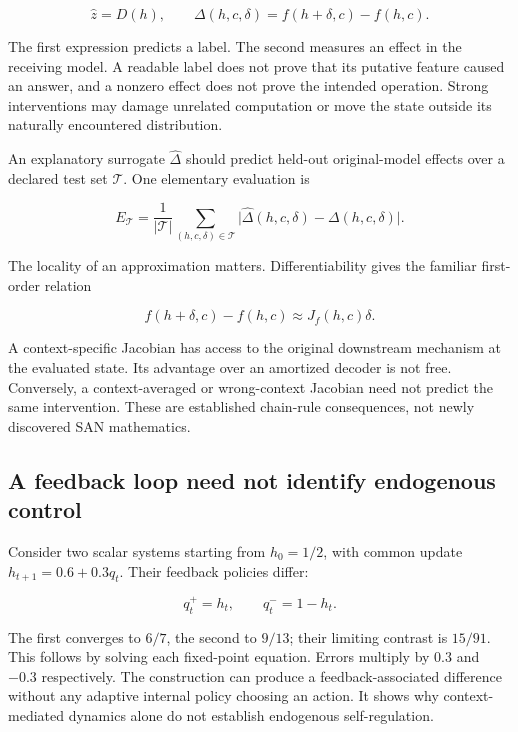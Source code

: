 \documentclass[11pt,letterpaper]{article}
\begin{document}
\begin{equation}
\widehat z=D(h),\qquad
\Delta(h,c,\delta)=f(h+\delta,c)-f(h,c). \tag{1}
\end{equation}

The first expression predicts a label. The second measures an effect in the receiving model. A readable label does not prove that its putative feature caused an answer, and a nonzero effect does not prove the intended operation. Strong interventions may damage unrelated computation or move the state outside its naturally encountered distribution.

An explanatory surrogate \(\widehat\Delta\) should predict held-out original-model effects over a declared test set \(\mathcal T\). One elementary evaluation is

\begin{equation}
E_{\mathcal T}=\frac{1}{|\mathcal T|}
\sum_{(h,c,\delta)\in\mathcal T}
\lvert\widehat\Delta(h,c,\delta)-\Delta(h,c,\delta)\rvert. \tag{2}
\end{equation}

The locality of an approximation matters. Differentiability gives the familiar first-order relation

\begin{equation}
f(h+\delta,c)-f(h,c)\approx J_f(h,c)\delta. \tag{3}
\end{equation}

A context-specific Jacobian has access to the original downstream mechanism at the evaluated state. Its advantage over an amortized decoder is not free. Conversely, a context-averaged or wrong-context Jacobian need not predict the same intervention. These are established chain-rule consequences, not newly discovered SAN mathematics.

\subsection{A feedback loop need not identify endogenous control}

Consider two scalar systems starting from \(h_0=1/2\), with common update \(h_{t+1}=0.6+0.3q_t\). Their feedback policies differ:

\begin{equation}
q_t^+=h_t,\qquad q_t^-=1-h_t. \tag{4}
\end{equation}

The first converges to \(6/7\), the second to \(9/13\); their limiting contrast is \(15/91\). This follows by solving each fixed-point equation. Errors multiply by \(0.3\) and \(-0.3\) respectively. The construction can produce a feedback-associated difference without any adaptive internal policy choosing an action. It shows why context-mediated dynamics alone do not establish endogenous self-regulation.
\end{document}
